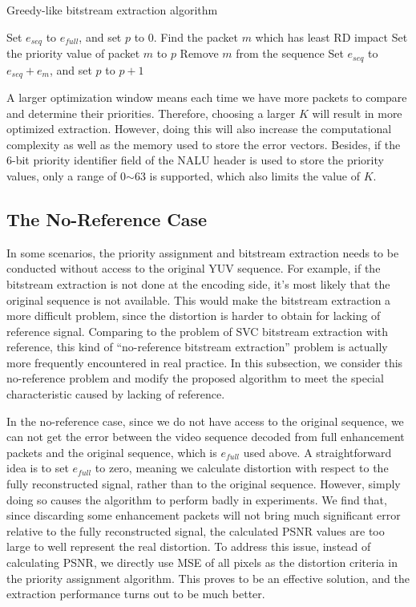 \documentclass[journal]{IEEEtran}
\begin{document}
\begin{algorithm}
\caption{Greedy-like bitstream extraction algorithm}
\label{algo:greedy}
\begin{algorithmic}
    \STATE Set $e_{seq}$ to $e_{full}$, and set $p$ to 0.
		    \STATE Find the packet $m$ which has least RD impact
		\ENDFOR
		\STATE Set the priority value of packet $m$ to $p$
		\STATE Remove $m$ from the sequence
		\STATE Set $e_{seq}$ to $e_{seq} + e_m$, and set $p$ to $p+1$
    \ENDWHILE
\end{algorithmic}
\end{algorithm}

A larger optimization window means each time we have more packets to compare and determine their priorities. Therefore, choosing a larger $K$ will result in more optimized extraction. However, doing this will also increase the computational complexity as well as the memory used to store the error vectors. Besides, if the 6-bit priority identifier field of the NALU header is used to store the priority values, only a range of 0$\sim$63 is supported, which also limits the value of $K$.

\subsection{The No-Reference Case}
\label{subsec:noref}

In some scenarios, the priority assignment and bitstream extraction needs to be conducted without access to the original YUV sequence. For example, if the bitstream extraction is not done at the encoding side, it's most likely that the original sequence is not available. This would make the bitstream extraction a more difficult problem, since the distortion is harder to obtain for lacking of reference signal. Comparing to the problem of SVC bitstream extraction with reference, this kind of ``no-reference bitstream extraction'' problem is actually more frequently encountered in real practice. In this subsection, we consider this no-reference problem and modify the proposed algorithm to meet the special characteristic caused by lacking of reference.

In the no-reference case, since we do not have access to the original sequence, we can not get the error between the video sequence decoded from full enhancement packets and the original sequence, which is $e_{full}$ used above. A straightforward idea is to set $e_{full}$ to zero, meaning we calculate distortion with respect to the fully reconstructed signal, rather than to the original sequence. However, simply doing so causes the algorithm to perform badly in experiments. We find that, since discarding some enhancement packets will not bring much significant error relative to the fully reconstructed signal, the calculated PSNR values are too large to well represent the real distortion. To address this issue, instead of calculating PSNR, we directly use MSE of all pixels as the distortion criteria in the priority assignment algorithm. This proves to be an effective solution, and the extraction performance turns out to be much better.
\end{document}
